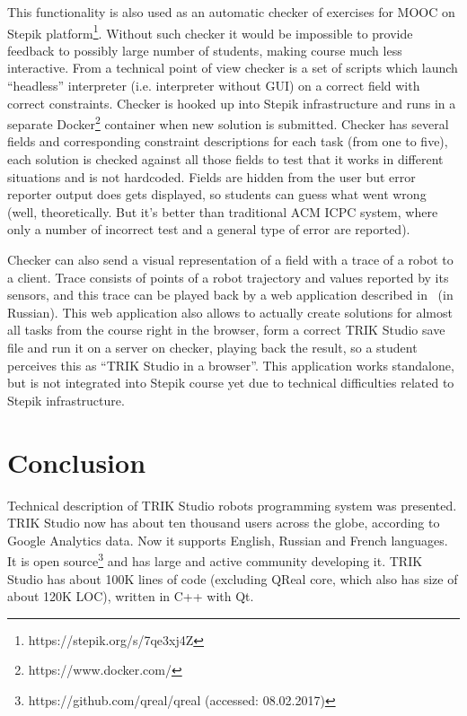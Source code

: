 \documentclass[conference]{IEEEtran}
\begin{document}
{This functionality is also used as an automatic checker of exercises for MOOC on Stepik platform\footnote{https://stepik.org/s/7qe3xj4Z}. Without such checker it would be impossible to provide feedback to possibly large number of students, making course much less interactive. From a technical point of view checker is a set of scripts which launch "`headless"' interpreter (i.e. interpreter without GUI) on a correct field with correct constraints. Checker is hooked up into Stepik infrastructure and runs in a separate Docker\footnote{https://www.docker.com/} container when new solution is submitted. Checker has several fields and corresponding constraint descriptions for each task (from one to five), each solution is checked against all those fields to test that it works in different situations and is not hardcoded. Fields are hidden from the user but error reporter output does gets displayed, so students can guess what went wrong (well, theoretically. But it's better than traditional ACM ICPC system, where only a number of incorrect test and a general type of error are reported).

Checker can also send a visual representation of a field with a trace of a robot to a client. Trace consists of points of a robot trajectory and values reported by its sensors, and this trace can be played back by a web application described in~\cite{zakharov2016web} (in Russian). This web application also allows to actually create solutions for almost all tasks from the course right in the browser, form a correct TRIK Studio save file and run it on a server on checker, playing back the result, so a student perceives this as "`TRIK Studio in a browser"'. This application works standalone, but is not integrated into Stepik course yet due to technical difficulties related to Stepik infrastructure.

\section*{Conclusion}
\label{chapter:conclusion}

Technical description of TRIK Studio robots programming system was presented. TRIK Studio now has about ten thousand users across the globe, according to Google Analytics data. Now it supports English, Russian and French languages. It is open source\footnote{https://github.com/qreal/qreal (accessed: 08.02.2017)} and has large and active community developing it. TRIK Studio has about 100K lines of code (excluding QReal core, which also has size of about 120K LOC), written in C++ with Qt.

}
\end{document}

